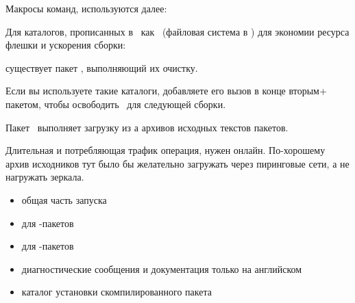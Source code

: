 {


Макросы команд, используются далее:




Для каталогов, прописанных в \ как \ (файловая
система в \ram) для экономии ресурса флешки и ускорения сборки:



существует пакет , выполняющий их очистку.

Если вы используете такие каталоги, добавляете его вызов в конце вторым+ 
пакетом, чтобы освободить \ram\ для следующей сборки. 








Пакет \ выполняет загрузку из \internet а архивов исходных текстов
пакетов. 

Длительная и потребляющая трафик операция, нужен онлайн. По-хорошему архив
исходников тут было бы желательно загружать через пиринговые сети, а не
нагружать зеркала.




\begin{itemize}
  \item[\file{CFG}] общая часть запуска 
  \item[\file{BCFG}] для -пакетов
  \item[\file{TCFG}] для -пакетов
\end{itemize}

\begin{itemize}
  \item{} диагностические сообщения и документация только на
английском
\item{} каталог установки скомпилированного пакета
\end{itemize}

}
